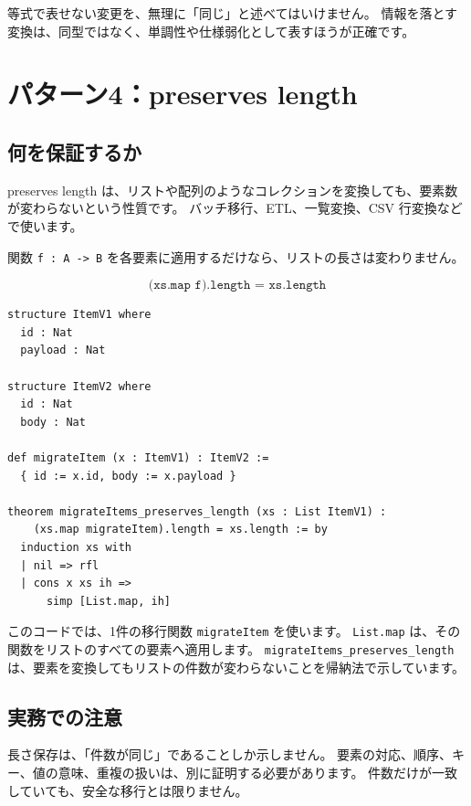 等式で表せない変更を、無理に「同じ」と述べてはいけません。
情報を落とす変換は、同型ではなく、単調性や仕様弱化として表すほうが正確です。

\section{パターン4：preserves length}

\subsection{何を保証するか}

preserves length は、リストや配列のようなコレクションを変換しても、要素数が変わらないという性質です。
バッチ移行、ETL、一覧変換、CSV 行変換などで使います。

関数 \texttt{f : A -> B} を各要素に適用するだけなら、リストの長さは変わりません。

\[
\texttt{(xs.map f).length = xs.length}
\]

\begin{listing}[htbp]
\begin{verbatim}
structure ItemV1 where
  id : Nat
  payload : Nat

structure ItemV2 where
  id : Nat
  body : Nat

def migrateItem (x : ItemV1) : ItemV2 :=
  { id := x.id, body := x.payload }

theorem migrateItems_preserves_length (xs : List ItemV1) :
    (xs.map migrateItem).length = xs.length := by
  induction xs with
  | nil => rfl
  | cons x xs ih =>
      simp [List.map, ih]
\end{verbatim}
\caption{\texttt{migrateItems\_preserves\_length}}
\label{lst:appc_preserves_length}
\end{listing}

このコードでは、1件の移行関数 \texttt{migrateItem} を使います。
\texttt{List.map} は、その関数をリストのすべての要素へ適用します。
\texttt{migrateItems\_}\allowbreak\texttt{preserves\_length} は、要素を変換してもリストの件数が変わらないことを帰納法で示しています。

\subsection{実務での注意}

長さ保存は、「件数が同じ」であることしか示しません。
要素の対応、順序、キー、値の意味、重複の扱いは、別に証明する必要があります。
件数だけが一致していても、安全な移行とは限りません。

